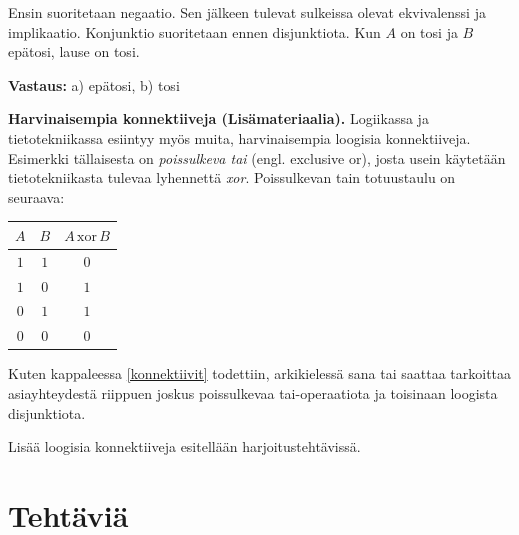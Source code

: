 Ensin suoritetaan negaatio. Sen jälkeen tulevat sulkeissa olevat ekvivalenssi ja implikaatio. Konjunktio suoritetaan ennen disjunktiota. Kun $A$ on tosi ja $B$ epätosi, lause on tosi.

{\bf Vastaus:} a) epätosi, b) tosi

{\bf Harvinaisempia konnektiiveja (Lisämateriaalia).} Logiikassa ja tietotekniikassa esiintyy myös muita, harvinaisempia loogisia konnektiiveja. Esimerkki tällaisesta on {\em poissulkeva tai} (engl. exclusive or), josta usein käytetään tietotekniikasta tulevaa lyhennettä {\em xor}. Poissulkevan tain totuustaulu on seuraava:

\bigskip

\begin{center}
\begin{tabular}{|c|c|c|}\hline
$A$ & $B$ & $A\,\mathrm{xor}\,B$ \\ \hline
$1$ & $1$ & $0$\\ %
$1$ & $0$ & $1$\\
$0$ & $1$ & $1$\\
$0$ & $0$ & $0$\\ \hline
\end{tabular}
\end{center}

\bigskip

Kuten kappaleessa \ref{konnektiivit} todettiin, arkikielessä sana tai saattaa tarkoittaa asiayhteydestä riippuen joskus poissulkevaa tai-operaatiota ja toisinaan loogista disjunktiota.

Lisää loogisia konnektiiveja esitellään harjoitustehtävissä.


\newpage


\section*{Tehtäviä}


